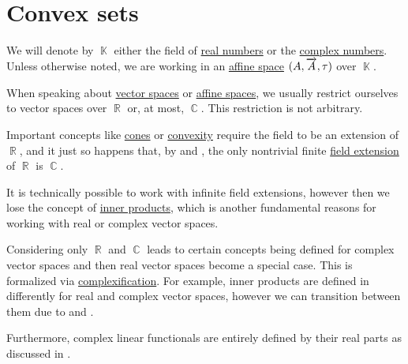 \section{Convex sets}\label{sec:convex_sets}

We will denote by \( \BbbK \) either the field of \hyperref[def:real_numbers]{real numbers} or the \hyperref[def:real_numbers]{complex numbers}. Unless otherwise noted, we are working in an \hyperref[def:affine_space]{affine space} \( (A, \overrightarrow{A}, \tau) \) over \( \BbbK \).

\begin{remark}\label{rem:real_field_extensions}
  When speaking about \hyperref[def:vector_space]{vector spaces} or \hyperref[def:affine_space]{affine spaces}, we usually restrict ourselves to vector spaces over \( \BbbR \) or, at most, \( \BbbC \). This restriction is not arbitrary.

  Important concepts like \hyperref[def:geometric_cone]{cones} or \hyperref[def:convex_hull]{convexity} require the field to be an extension of \( \BbbR \), and it just so happens that, by  and , the only nontrivial finite \hyperref[def:field/submodel]{field extension} of \( \BbbR \) is \( \BbbC \).

  It is technically possible to work with infinite field extensions, however then we lose the concept of \hyperref[def:inner_product_space]{inner products}, which is another fundamental reasons for working with real or complex vector spaces.

  Considering only \( \BbbR \) and \( \BbbC \) leads to certain concepts being defined for complex vector spaces and then real vector spaces become a special case. This is formalized via \hyperref[def:complexification]{complexification}. For example, inner products are defined in  differently for real and complex vector spaces, however we can transition between them due to  and .

  Furthermore, complex linear functionals are entirely defined by their real parts as discussed in .
\end{remark}

